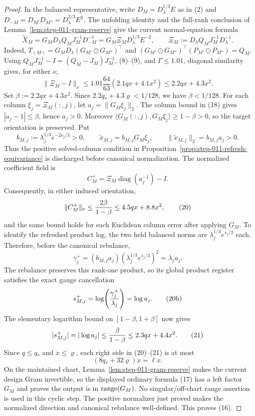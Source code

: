 \begin{proposition}
\begin{proof}
In the balanced representative, write
\(D_M=D_\lambda^{1/3}E\) as in (2) and
\(D_{-M}=D_{M'}D_{M''}=D_\lambda^{2/3}E^2\). The unfolding identity and
the full-rank conclusion of Lemma~\ref{lem:step-011-gram-reserve} give the
current normal-equation formula
\[
 \widetilde X_M
 =G_MD_\lambda Q_MJ_M^{-1}D_{-M}^{-1}
 =G_M\Xi_M D_\lambda^{1/3}E^{-2},
 \qquad
 \Xi_M:=D_\lambda Q_MJ_M^{-1}D_\lambda^{-1}.
\tag{17}
\]
Indeed, \(T_{(M)}=G_MD_\lambda(G_{M'}\odot G_{M''})^\top\) and
\((G_{M'}\odot G_{M''})^\top(P_{M'}\odot P_{M''})=Q_M\).
Using \(Q_MJ_M^{-1}-I=(Q_M-J_M)J_M^{-1}\), (8)--(9), and
\(\Gamma\le1.01\), diagonal similarity gives, for either \(\nu\),
\[
 \|\Xi_M-I\|_\nu
 \le1.01\frac{64}{63}(2.1qx+4.1x^2)
 \le2.2qx+4.3x^2.
\tag{18}
\]
Set \(\beta:=2.2qx+4.3x^2\). Since
\(2.2q_*+4.3\varrho<1/128\), we have \(\beta<1/128\). For each column
\(\xi_j=\Xi_M(:,j)\), let \(a_j=\|G_M\xi_j\|_2\). The column bound in
(18) gives \(|a_j-1|\le\beta\), hence \(a_j>0\). Moreover
\(\langle G_M(:,j),G_M\xi_j\rangle\ge1-\beta>0\), so the target
orientation is preserved. Put
\[
 b_{M,j}:=\lambda_j^{1/3}e^{-2s_j/3}>0,
 \qquad \widetilde x_{M,j}=b_{M,j}G_M\xi_j,
 \qquad \|\widetilde x_{M,j}\|_2=b_{M,j}a_j>0.
\tag{19a}
\]
Thus the positive solved-column condition in
Proposition~\ref{prop:step-011-refresh-equivariance} is discharged before
canonical normalization. The normalized coefficient field is
\[
 C_M^+=\Xi_M\operatorname{diag}(a_j^{-1})-I.
\tag{19}
\]
Consequently, in either induced orientation,
\[
 \|C_M^+\|_\nu
 \le {2\beta\over1-\beta}
 \le4.5qx+8.8x^2,
\tag{20}
\]
and the same bound holds for each Euclidean column error after applying
$G_M$. To identify the refreshed product log, the two held balanced norms are
\(\lambda_j^{1/3}e^{s_j/3}\) each. Therefore, before the canonical rebalance,
\[
 \gamma_j^+
 = (b_{M,j}a_j)
   (\lambda_j^{1/3}e^{s_j/3})^2
 = \lambda_j a_j.
\tag{20a}
\]
The rebalance preserves this rank-one product, so its global product register
satisfies the exact gauge cancellation
\[
 s_{M,j}^+
 =\log\!\left({\gamma_j^+\over\lambda_j}\right)=\log a_j.
\tag{20b}
\]
The elementary logarithm bound on \([1-\beta,1+\beta]\) now gives
\[
 |s_{M,j}^+|=|\log a_j|
 \le {\beta\over1-\beta}
 \le2.3qx+4.4x^2.
\tag{21}
\]
Since \(q\le q_*\) and \(x\le\varrho\), each right side in (20)--(21)
is at most
\[
 (8q_*+32\varrho)x=\ell x.
\tag{22}
\]
On the maintained chart, Lemma~\ref{lem:step-011-gram-reserve} makes the
current design Gram invertible, so the displayed ordinary formula (17) has a
left factor \(G_M\) and proves the output is in \({\rm range}(G_M)\). No
singular/off-chart range assertion is used in this cyclic step. The positive
normalizer just proved makes the normalized direction and canonical rebalance
well-defined. This proves (16).


\end{proof}
\end{proposition}
